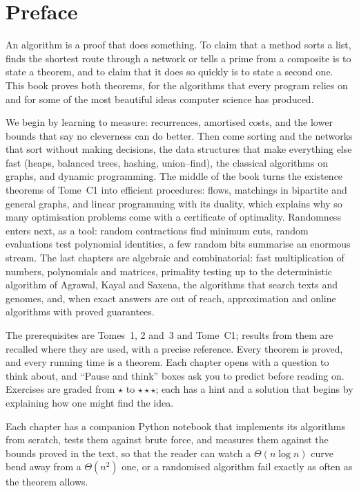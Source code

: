 \chapter*{Preface}

An algorithm is a proof that does something. To claim that a method sorts a list, finds the shortest route through a
network or tells a prime from a composite is to state a theorem, and to claim that it does so quickly is to state a
second one. This book proves both theorems, for the algorithms that every program relies on and for some of the most
beautiful ideas computer science has produced.

We begin by learning to measure: recurrences, amortised costs, and the lower bounds that say no cleverness can do
better. Then come sorting and the networks that sort without making decisions, the data structures that make
everything else fast (heaps, balanced trees, hashing, union--find), the classical algorithms on graphs, and dynamic
programming. The middle of the book turns the existence theorems of Tome~C1 into efficient procedures: flows,
matchings in bipartite and general graphs, and linear programming with its duality, which explains why so many
optimisation problems come with a certificate of optimality. Randomness enters next, as a tool: random contractions
find minimum cuts, random evaluations test polynomial identities, a few random bits summarise an enormous stream.
The last chapters are algebraic and combinatorial: fast multiplication of numbers, polynomials and matrices, primality
testing up to the deterministic algorithm of Agrawal, Kayal and Saxena, the algorithms that search texts and
genomes, and, when exact answers are out of reach, approximation and online algorithms with proved guarantees.

The prerequisites are Tomes~1, 2 and~3 and Tome~C1; results from them are recalled where they are used, with a
precise reference. Every theorem is proved, and every running time is a theorem. Each chapter opens with a question
to think about, and ``Pause and think'' boxes ask you to predict before reading on. Exercises are graded from $\star$
to $\star\star\star$; each has a hint and a solution that begins by explaining how one might find the idea.

Each chapter has a companion Python notebook that implements its algorithms from scratch, tests them against brute
force, and measures them against the bounds proved in the text, so that the reader can watch a $\Theta(n\log n)$
curve bend away from a $\Theta(n^2)$ one, or a randomised algorithm fail exactly as often as the theorem allows.
